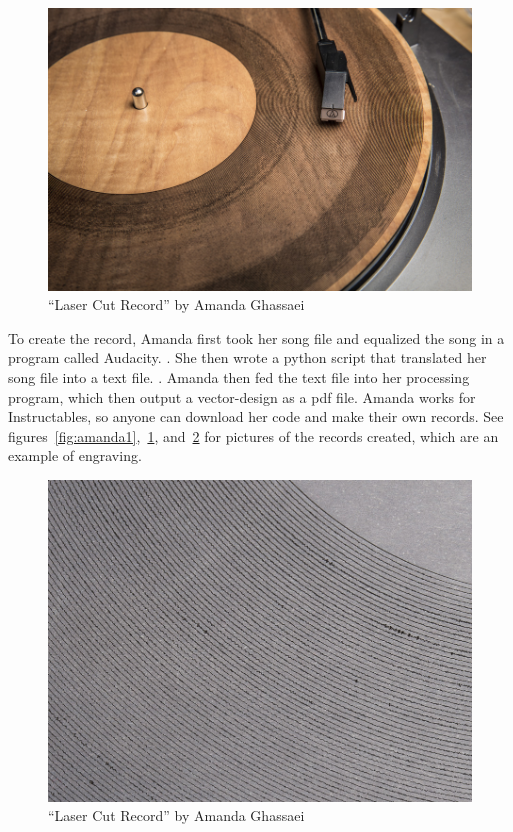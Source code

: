 \documentclass[12pt singlecol]{article}
\begin{document}
\begin{flushleft}
\begin{figure}
  \centering  
  \includegraphics[width=\linewidth]{amanda2}
  \caption{``Laser Cut Record'' by Amanda Ghassaei \cite{ghassaei13}}
  \label{fig:amanda2}
\end{figure}

To create the record, Amanda first took her song file and equalized the song in a program called Audacity. \cite{instruct13, audacity}. She then wrote a python script that translated her song file into a text file. \cite{instruct13, python}. Amanda then fed the text file into her processing program, which then output a vector-design as a pdf file. \cite{instruct13, processing13} Amanda works for Instructables, so anyone can download her code and make their own records. \cite{instruct13} See figures~\ref{fig:amanda1},~\ref{fig:amanda2}, and~\ref{fig:amanda3} for pictures of the records created, which are an example of engraving.

\begin{figure}
  \centering  
  \includegraphics[width=\linewidth]{amanda3}
  \caption{``Laser Cut Record'' by Amanda Ghassaei \cite{ghassaei13}}
  \label{fig:amanda3}
\end{figure}	


\end{flushleft}
\end{document}
